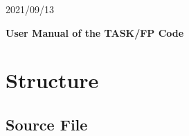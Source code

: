 \documentclass[11pt]{article}
\begin{document}
\begin{flushright}
2021/09/13
\end{flushright}

\begin{center}
\textbf{\Large User Manual of the TASK/FP Code}
\end{center}

\tableofcontents

\section{Structure}

\subsection{Source File}
\end{document}
